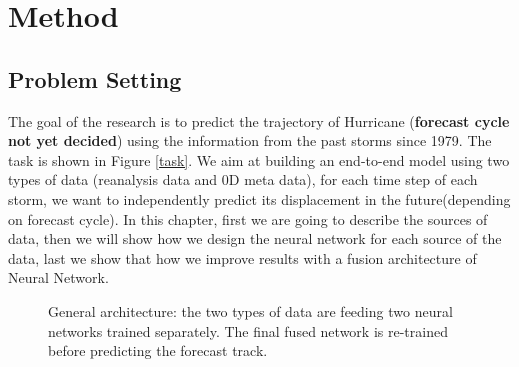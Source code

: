 

\chapter{Method}
\section{Problem Setting}


The goal of the research is to predict the trajectory of Hurricane (\textbf{forecast cycle not yet decided}) using the information from the past storms since 1979. The task is shown in Figure \ref{task}. We aim at building an end-to-end model using two types of data (reanalysis data and 0D meta data), for each time step of each storm, we want to independently predict its displacement in the future(depending on forecast cycle). In this chapter, first we are going to describe the sources of data,  then we will show how we design the neural network for each source of the data, last we show that how we improve results with a fusion architecture of Neural Network. 

\begin{figure}[H]
	\begin{center}
		\hsize {}
	\end{center}
	\caption{General architecture: the two types of data are feeding two neural networks trained separately. The final fused network is re-trained before predicting the forecast track. }
	\label{fig:task}
\end{figure}

